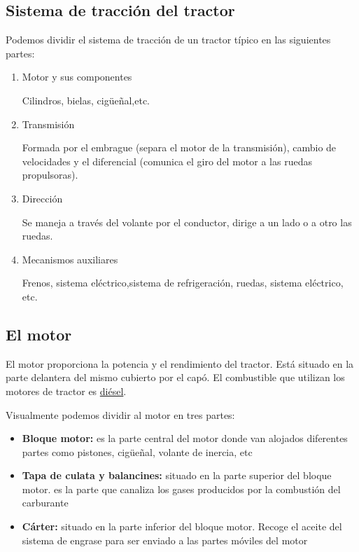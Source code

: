 \documentclass[a4paper,12pt,oneside]{article}
\begin{document}
\subsection{Sistema de tracción del tractor}
\label{sec:orgbf0877b}

Podemos dividir el sistema de tracción de un tractor típico en las siguientes
partes:
\begin{enumerate}
\item Motor y sus componentes
\label{sec:orge563fc7}

Cilindros, bielas, cigüeñal,etc.

\item Transmisión
\label{sec:org33fb2c7}

Formada por el embrague (separa el motor de la transmisión), cambio de
velocidades y el diferencial (comunica el giro del motor a las ruedas
propulsoras).
\item Dirección
\label{sec:org363ec6a}

Se maneja a través del volante por el conductor, dirige a un lado o a otro las
ruedas.
\item Mecanismos auxiliares
\label{sec:org0ed8f28}

Frenos, sistema eléctrico,sistema de refrigeración, ruedas, sistema eléctrico,
etc.
\end{enumerate}

\subsection{El motor}
\label{sec:org988e336}

El motor proporciona la potencia y el rendimiento del tractor.  Está situado en 
la parte delantera del mismo cubierto por el capó. El combustible que utilizan
los motores de tractor es \uline{diésel}.

Visualmente podemos dividir al motor en tres partes:
\begin{itemize}
\item \textbf{Bloque motor:} es la parte central del motor donde van alojados diferentes
partes como pistones, cigüeñal, volante de inercia, etc
\item \textbf{Tapa de culata y balancines:} situado en la parte superior del bloque
motor. es la parte que canaliza los gases producidos por la combustión del carburante
\item \textbf{Cárter:} situado en la parte inferior del bloque motor. Recoge el aceite del
sistema de engrase para ser enviado a las partes móviles del motor
\end{itemize}
\end{document}
